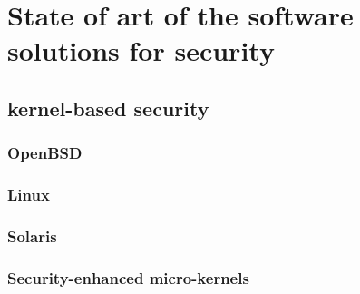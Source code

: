 
\chapter{State of art of the software solutions for security}

{\it

}

\doMinitoc

\section{kernel-based security}

\subsection{OpenBSD}

\subsection{Linux}

\paragraph{}

\subsection{Solaris}

\subsection{Security-enhanced micro-kernels}
